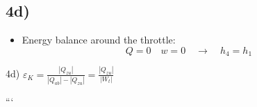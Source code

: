 

\subsection*{4d)}

\begin{itemize}
    \item Energy balance around the throttle:
    \[
    Q = 0 \quad w = 0 \quad \rightarrow \quad h_4 = h_1
    \]
\end{itemize}

4d) \(\varepsilon_K = \frac{|Q_{zu}|}{|Q_{ab}| - |Q_{zu}|} = \frac{|Q_{zu}|}{|W_{t}|}\)

```